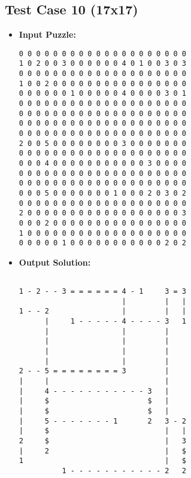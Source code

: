 \subsection{Test Case 10 (17x17)}
\begin{itemize}
    \item \textbf{Input Puzzle:}
    \begin{verbatim}
0 0 0 0 0 0 0 0 0 0 0 0 0 0 0 0 0 0 0 0
1 0 2 0 0 3 0 0 0 0 0 0 4 0 1 0 0 3 0 3
0 0 0 0 0 0 0 0 0 0 0 0 0 0 0 0 0 0 0 0
1 0 0 2 0 0 0 0 0 0 0 0 0 0 0 0 0 0 0 0
0 0 0 0 0 0 1 0 0 0 0 0 4 0 0 0 0 3 0 1
0 0 0 0 0 0 0 0 0 0 0 0 0 0 0 0 0 0 0 0
0 0 0 0 0 0 0 0 0 0 0 0 0 0 0 0 0 0 0 0
0 0 0 0 0 0 0 0 0 0 0 0 0 0 0 0 0 0 0 0
0 0 0 0 0 0 0 0 0 0 0 0 0 0 0 0 0 0 0 0
2 0 0 5 0 0 0 0 0 0 0 0 3 0 0 0 0 0 0 0
0 0 0 0 0 0 0 0 0 0 0 0 0 0 0 0 0 0 0 0
0 0 0 4 0 0 0 0 0 0 0 0 0 0 0 3 0 0 0 0
0 0 0 0 0 0 0 0 0 0 0 0 0 0 0 0 0 0 0 0
0 0 0 0 0 0 0 0 0 0 0 0 0 0 0 0 0 0 0 0
0 0 0 5 0 0 0 0 0 0 0 1 0 0 0 2 0 3 0 2
0 0 0 0 0 0 0 0 0 0 0 0 0 0 0 0 0 0 0 0
2 0 0 0 0 0 0 0 0 0 0 0 0 0 0 0 0 0 0 3
0 0 0 2 0 0 0 0 0 0 0 0 0 0 0 0 0 0 0 0
1 0 0 0 0 0 0 0 0 0 0 0 0 0 0 0 0 0 0 0
0 0 0 0 0 1 0 0 0 0 0 0 0 0 0 0 0 2 0 2

    \end{verbatim}
    \item \textbf{Output Solution:}
    \begin{verbatim}
                                       
1 - 2 - - 3 = = = = = = 4 - 1     3 = 3
                        |         |   |
1 - - 2                 |         |   |
      |     1 - - - - - 4 - - - - 3   1
      |                 |         |    
      |                 |         |    
      |                 |         |    
      |                 |         |    
2 - - 5 = = = = = = = = 3         |    
|     |                           |    
|     4 - - - - - - - - - - - 3   |    
|     $                       $   |    
|     $                       $   |    
|     5 - - - - - - - 1       2   3 - 2
|     $                           |   |
2     $                           |   3
|     2                           |   $
1                                 |   $
          1 - - - - - - - - - - - 2   2
    \end{verbatim}
\end{itemize}
